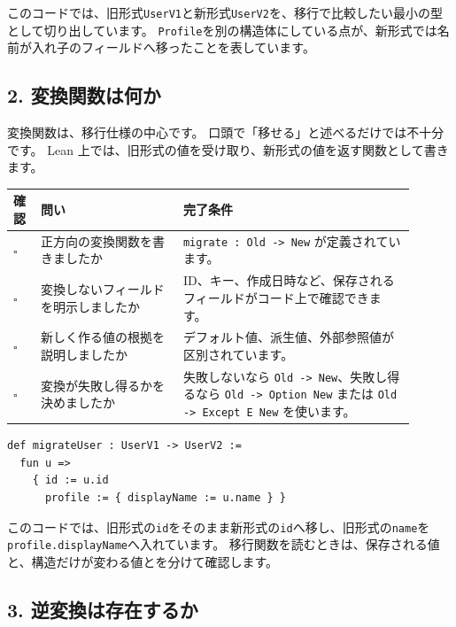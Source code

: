 このコードでは、旧形式\texttt{UserV1}と新形式\texttt{UserV2}を、移行で比較したい最小の型として切り出しています。
\texttt{Profile}を別の構造体にしている点が、新形式では名前が入れ子のフィールドへ移ったことを表しています。

\subsection{2. 変換関数は何か}

変換関数は、移行仕様の中心です。
口頭で「移せる」と述べるだけでは不十分です。
Lean 上では、旧形式の値を受け取り、新形式の値を返す関数として書きます。

\begin{longtable}{@{}p{0.06\linewidth}p{0.32\linewidth}p{0.52\linewidth}@{}}
\toprule
確認 & 問い & 完了条件 \\
\midrule
\endhead
\(\square\) & 正方向の変換関数を書きましたか & \texttt{migrate : Old -> New} が定義されています。 \\
\(\square\) & 変換しないフィールドを明示しましたか & ID、キー、作成日時など、保存されるフィールドがコード上で確認できます。 \\
\(\square\) & 新しく作る値の根拠を説明しましたか & デフォルト値、派生値、外部参照値が区別されています。 \\
\(\square\) & 変換が失敗し得るかを決めましたか & 失敗しないなら \texttt{Old -> New}、失敗し得るなら \texttt{Old -> Option New} または \texttt{Old -> Except E New} を使います。 \\
\bottomrule
\end{longtable}

\begin{listing}[htbp]
\begin{verbatim}
def migrateUser : UserV1 -> UserV2 :=
  fun u =>
    { id := u.id
      profile := { displayName := u.name } }
\end{verbatim}
\caption{\texttt{migrateUser}}
\label{lst:appD_migrate_function}
\end{listing}

このコードでは、旧形式の\texttt{id}をそのまま新形式の\texttt{id}へ移し、旧形式の\texttt{name}を\texttt{profile.displayName}へ入れています。
移行関数を読むときは、保存される値と、構造だけが変わる値とを分けて確認します。

\clearpage
\subsection{3. 逆変換は存在するか}

